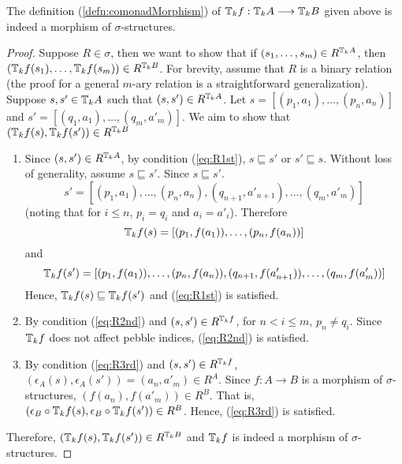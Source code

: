 \begin{prop}
The definition (\ref{defn:comonadMorphism}) of ${\mathbb{T}_{k}f}:{\mathbb{T}_{k}A} \longrightarrow {\mathbb{T}_{k}B}$ given above is indeed a morphism of $\sigma$-structures. 
\begin{proof}
Suppose $R \in \sigma$, then we want to show that if $(s_{1},\dots,s_{m}) \in R^{{\mathbb{T}_{k}A}}$, then \linebreak $({\mathbb{T}_{k}f}(s_{1}),\dots,{\mathbb{T}_{k}f}(s_{m})) \in R^{{\mathbb{T}_{k}B}}$. For brevity, assume that $R$ is a binary relation (the proof for a general $m$-ary relation is a straightforward generalization). Suppose $s,s' \in {\mathbb{T}_{k}A}$ such that $(s,s') \in R^{{\mathbb{T}_{k}A}}$. Let $s = [(p_{1},a_{1}),\dots,(p_{n},a_{n})]$ and $s' = [(q_{1},a_{1}),\dots,(q_{m},a'_{m})]$. We aim to show that $({\mathbb{T}_{k}f}(s),{\mathbb{T}_{k}f}(s')) \in R^{{\mathbb{T}_{k}B}}$ \\
\begin{enumerate}
\item  Since $(s,s') \in R^{{\mathbb{T}_{k}A}}$, by condition (\ref{eq:R1st}), $s \sqsubseteq s'$ or $s' \sqsubseteq s$. Without loss of generality, assume $s \sqsubseteq s'$. Since $s \sqsubseteq s'$.
$$s' = [(p_{1},a_{1}),\dots,(p_{n},a_{n}),(q_{n+1},a'_{n+1}),\dots,(q_{m},a'_{m})]$$ 
(noting that for $i \leq n$, $p_{i} = q_{i}$ and $a_{i} = a'_{i}$). Therefore $${\mathbb{T}_{k}f}(s) = [(p_{1},f(a_{1})),\dots,(p_{n},f(a_{n}))]$$ 
and 
$${\mathbb{T}_{k}f}(s') =[(p_{1},f(a_{1})),\dots,(p_{n},f(a_{n})),(q_{n+1},f(a'_{n+1})), \dots,(q_{m},f(a'_{m}))]$$ 
Hence, ${\mathbb{T}_{k}f}(s) \sqsubseteq {\mathbb{T}_{k}f}(s')$ and (\ref{eq:R1st}) is satisfied. 
\item By condition (\ref{eq:R2nd}) and $(s,s') \in R^{{\mathbb{T}_{k}f}}$, for $n < i \leq m$, $p_{n} \not= q_{i}$. Since ${\mathbb{T}_{k}f}$ does not affect pebble indices, (\ref{eq:R2nd}) is satisfied.
\item  By condition (\ref{eq:R3rd}) and $(s,s') \in R^{{\mathbb{T}_{k}f}}$, $(\epsilon_{A}(s),\epsilon_{A}(s')) = (a_{n},a'_{m}) \in R^{A}$. Since $f:A \rightarrow B$ is a morphism of $\sigma$-structures, $(f(a_{n}),f(a'_{m})) \in R^{B}$. That is, $(\epsilon_{B}\circ {\mathbb{T}_{k}f}(s),\epsilon_{B} \circ {\mathbb{T}_{k}f}(s')) \in R^{B}$. Hence, (\ref{eq:R3rd}) is satisfied.
\end{enumerate}
Therefore, $({\mathbb{T}_{k}f}(s),{\mathbb{T}_{k}f}(s')) \in R^{{\mathbb{T}_{k}B}}$ and ${\mathbb{T}_{k}f}$ is indeed a morphism of $\sigma$-structures. 
\end{proof}
\end{prop}
